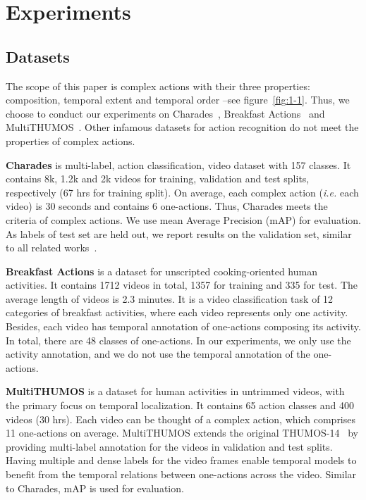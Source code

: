 \documentclass[10pt,twocolumn,letterpaper]{article}
\newcommand{\partitle}[1]{\noindent\textbf{#1}}
\begin{document}
\section{Experiments}\label{sec:experiments}
\subsection{Datasets}
The scope of this paper is complex actions with their three properties: composition, temporal extent and temporal order --see figure~\ref{fig:1-1}. Thus, we choose to conduct our experiments on Charades~\cite{sigurdsson2016hollywood}, Breakfast Actions~\cite{kuehne2014language} and MultiTHUMOS~\cite{yeung2018every}.
Other infamous datasets for action recognition do not meet the properties of complex actions.

\partitle{Charades}
is multi-label, action classification, video dataset with 157 classes.
It contains 8k, 1.2k and 2k videos for training, validation and test splits, respectively (67 hrs for training split).
On average, each complex action (\textit{i.e.} each video) is 30 seconds and contains 6 one-actions.
Thus, Charades meets the criteria of complex actions.
We use mean Average Precision (mAP) for evaluation.
As labels of test set are held out, we report results on the validation set, similar to all related works~\cite{sigurdsson2017asynchronous, girdhar2017actionvlad,sigurdsson2017asynchronous,wang2017non,wang2018videos}.

\partitle{Breakfast Actions}
is a dataset for unscripted cooking-oriented human activities.
It contains 1712 videos in total, 1357 for training and 335 for test.
The average length of videos is 2.3 minutes.
It is a video classification task of 12 categories of breakfast activities, where each video represents only one activity.
Besides, each video has temporal annotation of one-actions composing its activity.
In total, there are 48 classes of one-actions.
In our experiments, we only use the activity annotation, and we do not use the temporal annotation of the one-actions.

\partitle{MultiTHUMOS}
is a dataset for human activities in untrimmed videos, with the primary focus on temporal localization.
It contains 65 action classes and 400 videos (30 hrs).
Each video can be thought of a complex action, which comprises 11 one-actions on average.
MultiTHUMOS extends the original THUMOS-14~\cite{idrees2017thumos} by providing multi-label annotation for the videos in validation and test splits.
Having multiple and dense labels for the video frames enable temporal models to benefit from the temporal relations between one-actions across the video.
Similar to Charades, mAP is used for evaluation.
\end{document}
